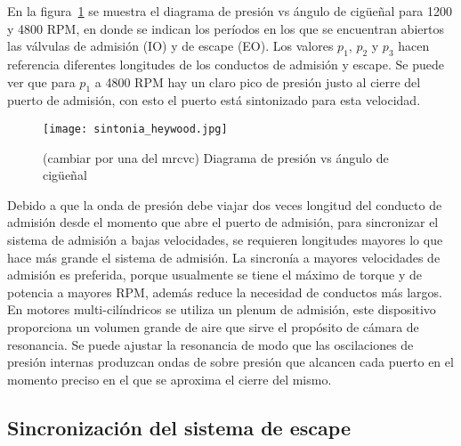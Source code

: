 En la figura~\ref{fig:sintonia1} se muestra el diagrama de presión vs ángulo de
cigüeñal para 1200 y 4800 RPM, en donde se indican los períodos en los que se
encuentran abiertos las válvulas de admisión (IO) y de escape (EO).
%
%
Los valores $p_1$, $p_2$ y $p_3$ hacen referencia diferentes longitudes de los
conductos de admisión y escape.
%
Se puede ver que para $p_1$ a 4800 RPM hay un claro pico de presión justo al
cierre del puerto de admisión, con esto el puerto está sintonizado para esta
velocidad.

\begin{figure} \centering
\texttt{[image: sintonia\_heywood.jpg]}
    \caption{(cambiar por una del mrcvc) Diagrama de presión vs ángulo de
cigüeñal}\label{fig:sintonia1}
\end{figure}

Debido a que la onda de presión debe viajar dos veces longitud del conducto de
admisión desde el momento que abre el puerto de admisión, para sincronizar el
sistema de admisión a bajas velocidades, se requieren longitudes mayores lo que
hace más grande el sistema de admisión.
%
La sincronía a mayores velocidades de admisión es preferida, porque usualmente
se tiene el máximo de torque y de potencia a mayores RPM, además reduce la
necesidad de conductos más largos.
%
En motores multi-cilíndricos se utiliza un plenum de admisión, este dispositivo
proporciona un volumen grande de aire que sirve el propósito de cámara de
resonancia.
%
Se puede ajustar la resonancia de modo que las oscilaciones de presión internas
produzcan ondas de sobre presión que alcancen cada puerto en el momento preciso
en el que se aproxima el cierre del mismo.


\subsection{Sincronización del sistema de escape}

